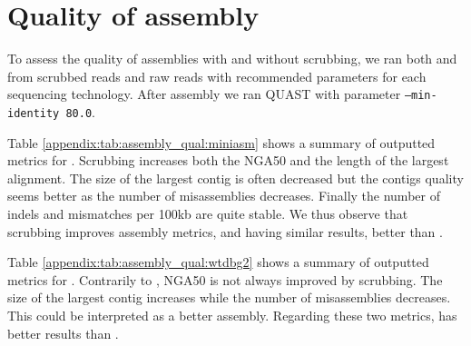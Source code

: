 \documentclass[./main.tex]{subfiles}
\begin{document}
%
%
%

 
\newpage
\section{Quality of assembly}\label{appendix:assembly_qual}

To assess the quality of assemblies with and without scrubbing, we ran both \miniasm and \wtdbg from scrubbed reads and raw reads with recommended parameters for each sequencing technology. After assembly we ran QUAST with parameter \texttt{--min-identity 80.0}. 


Table \ref{appendix:tab:assembly_qual:miniasm} shows a summary of outputted metrics for \miniasm. Scrubbing increases both the NGA50 and the length of the largest alignment. The size of the largest contig is often decreased but the contigs quality seems better as the number of misassemblies decreases. Finally the number of indels and mismatches per 100kb are quite stable. We thus observe that scrubbing improves assembly metrics, \yacrd and \dascrubber having similar results, better than \miniscrub. 
    
Table \ref{appendix:tab:assembly_qual:wtdbg2} shows a summary of outputted metrics for \wtdbg. Contrarily to \miniasm, NGA50 is not always improved by scrubbing.  The size of the largest contig increases while the number of misassemblies decreases. This could be interpreted as a better assembly. Regarding these two metrics, \yacrd has better results than \dascrubber.
\end{document}

